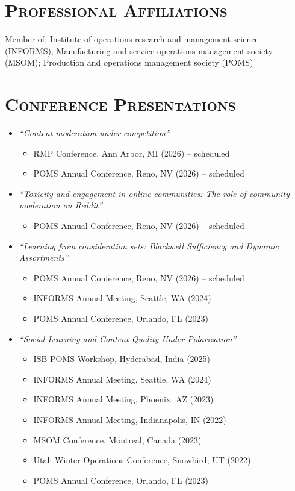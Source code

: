 \documentclass[11pt]{article}
\begin{document}
				\section*{\textsc{Professional Affiliations}}
				Member of: Institute of operations research and management science (INFORMS); Manufacturing and service operations management society (MSOM); Production and operations management society (POMS)



			\section*{\textbf{\textsc{Conference Presentations}}}
			\begin{itemize}


				\item \emph{``Content moderation under competition''}
				\begin{itemize}[label={$\circ\;$}]
					\item  RMP Conference, Ann Arbor, MI (2026) -- scheduled
					\item  POMS Annual Conference, Reno, NV (2026) -- scheduled
				\end{itemize}


				\item \emph{``Toxicity and engagement in online communities: The role of community moderation on Reddit''}
				\begin{itemize}[label={$\circ\;$}]
					\item  POMS Annual Conference, Reno, NV (2026) -- scheduled
				\end{itemize}


				\item \emph{``Learning from consideration sets: Blackwell Sufficiency and Dynamic Assortments''}
				\begin{itemize}[label={$\circ\;$}]
					\item  POMS Annual Conference, Reno, NV (2026) -- scheduled
					\item  INFORMS Annual Meeting, Seattle, WA (2024)
					\item  POMS Annual Conference, Orlando, FL (2023)
				\end{itemize}

				\item \emph{``Social Learning and Content Quality Under Polarization''}
				\begin{itemize}[label={$\circ\;$}]
					\item ISB-POMS Workshop, Hyderabad, India (2025)
					\item INFORMS Annual Meeting, Seattle, WA (2024)
					\item INFORMS Annual Meeting, Phoenix, AZ (2023)
					\item INFORMS Annual Meeting, Indianapolis, IN (2022)
					\item MSOM Conference, Montreal, Canada (2023)
					\item Utah Winter Operations Conference, Snowbird, UT (2022)
					\item POMS Annual Conference, Orlando, FL (2023)
				\end{itemize}


\end{itemize}
\end{document}
